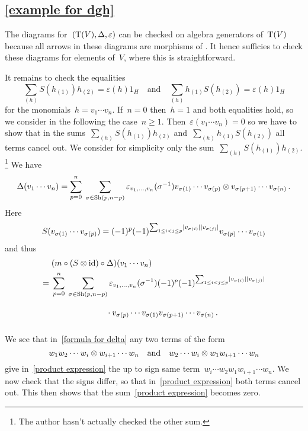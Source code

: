 \subsection{\cref{example for dgh}}
\label{example for dgh proof}

The {\dgc} diagrams for~$(\operatorname{T}(V), \Delta, \varepsilon)$ can be checked on algebra generators of~$\operatorname{T}(V)$ because all arrows in these diagrams are morphisms of {\dgas}.
It hence sufficies to check these diagrams for elements of~$V$, where this is straightforward.

It remains to check the equalities
\[
  \sum_{(h)} S(h_{(1)}) h_{(2)}
  =
  \varepsilon(h) 1_H
  \quad
  \text{and}\quad
  \sum_{(h)} h_{(1)} S(h_{(2)})
  =
  \varepsilon(h) 1_H
\]
for the monomials~$h = v_1 \dotsm v_n$.
If~$n = 0$ then~$h = 1$ and both equalities hold, so we consider in the following the case~$n \geq 1$.
Then~$\varepsilon(v_1 \dotsm v_n) = 0$ so we have to show that in the sums~$\sum_{(h)} S(h_{(1)}) h_{(2)}$ and~$\sum_{(h)} h_{(1)} S(h_{(2)})$ all terms cancel out.
We consider for simplicity only the sum~$\sum_{(h)} S(h_{(1)}) h_{(2)}$.%
\footnote{The author hasn’t actually checked the other sum.}
We have
\begin{equation}
  \label{formula for delta}
  \Delta(v_1 \dotsm v_n)
  =
  \sum_{p=0}^n
  \;
  \sum_{\sigma \in \operatorname{Sh}(p,n-p)}
  \varepsilon_{v_1, \dotsc, v_n}(\sigma^{-1})
  v_{\sigma(1)} \dotsm v_{\sigma(p)} \otimes v_{\sigma(p+1)} \dotsm v_{\sigma(n)} \,.
\end{equation}
Here
\[
  S(v_{\sigma(1)} \dotsm v_{\sigma(p)})
  =
  (-1)^p
  (-1)^{\sum_{1 \leq i < j \leq p} \lvert v_{\sigma(i)}\rvert \lvert v_{\sigma(j)}\rvert}
  v_{\sigma(p)} \dotsm v_{\sigma(1)}
\]
and thus
\begin{align}
  {}&
  (m \circ (S \tensor {\id}) \circ \Delta)(v_1 \dotsm v_n)
  \notag
\\
  ={}&
  \sum_{p=0}^n
  \;
  \sum_{\sigma \in \Sh(p,n-p)}
  \varepsilon_{v_1, \dotsc, v_n}(\sigma^{-1})
  (-1)^p
  (-1)^{\sum_{1 \leq i < j \leq p} \hdeg{v_{\sigma(i)}} \hdeg{v_{\sigma(j)}}}
  \notag
\\
  {}&
  \phantom{\sum_{p=0}^n \; \sum_{\sigma \in \Sh(p,n-p)}}
  \cdot v_{\sigma(p)} \dotsm v_{\sigma(1)} v_{\sigma(p+1)} \dotsm v_{\sigma(n)} \,.
  \label{product expression}
\end{align}
We see that in~\eqref{formula for delta} any two terms of the form
\[
  w_1 w_2 \dotsm w_i \otimes w_{i+1} \dotsm w_n
  \quad\text{and}\quad
  w_2 \dotsm w_i \otimes w_1 w_{i+1} \dotsm w_n
\]
give in~\eqref{product expression} the up to sign same term~$w_i \dotsm w_2 w_1 w_{i+1} \dotsm w_n$.
We now check that the signs differ, so that in~\eqref{product expression} both terms cancel out.
This then shows that the sum~\eqref{product expression} becomes zero.

